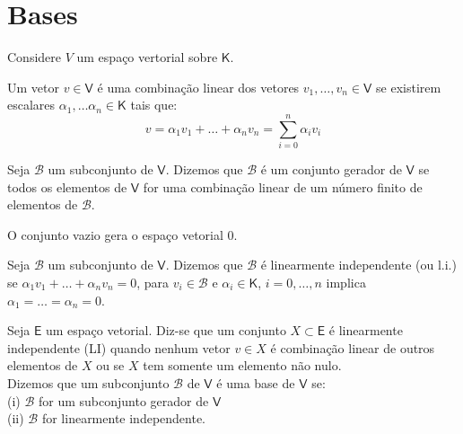 \documentclass[10pt,a4paper]{article}
\begin{document}
\section{Bases}
Considere $V$ um espaço vertorial sobre $\mathsf{K}$.

\begin{definition}
	Um vetor $v \in \mathsf{V}$ é uma combinação linear dos vetores $v_1, \dots, v_n \in \mathsf{V}$ se existirem escalares $\alpha_1, \dots \alpha_n \in \mathsf{K}$ tais que:
	\[
		v = \alpha_1 v_1 + \dots + \alpha_n v_n = \sum_{i = 0}^{n} \alpha_i v_i
	\]
\end{definition}

\begin{definition}
		Seja $\mathcal{B}$ um subconjunto de $\mathsf{V}$. Dizemos que $\mathcal{B}$ é um conjunto gerador de $\mathsf{V}$ se todos os elementos de $\mathsf{V}$ for uma combinação linear de um número finito de elementos de $\mathcal{B}$.
\end{definition}

\begin{definition}
	O conjunto vazio gera o espaço vetorial ${0}$.
\end{definition}

\begin{definition}
	Seja $\mathcal{B}$ um subconjunto de $\mathsf{V}$. Dizemos que $\mathcal{B}$ é linearmente independente (ou l.i.) se $\alpha_1 v_1 + \dots + \alpha_n v_n = 0$, para $v_i \in \mathcal{B}$ e $\alpha_i \in \mathsf{K}$, $i = 0, \dots, n$ implica $\alpha_1 = \dots = \alpha_n = 0$.
\end{definition}

\begin{definition}
	Seja $\textsf{E}$ um espaço vetorial. Diz-se que um conjunto $X \subset \textsf{E}$ é linearmente independente (LI) quando nenhum vetor $v \in X$ é combinação linear de outros elementos de $X$ ou se $X$ tem somente um elemento não nulo.\\
	
	 Dizemos que um subconjunto $\mathcal{B}$ de $\mathsf{V}$ é uma base de $\mathsf{V}$ se:\\
	(i) $\mathcal{B}$ for um subconjunto gerador de $\mathsf{V}$\\
	(ii) $\mathcal{B}$ for linearmente independente.
\end{definition}
\end{document}
